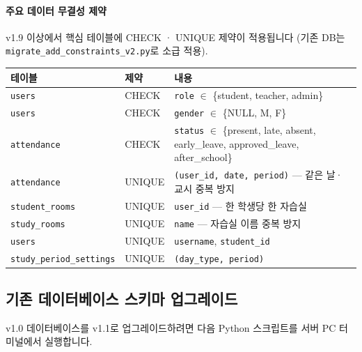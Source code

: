 \documentclass[a4paper,12pt]{article}
\begin{document}
\paragraph{주요 데이터 무결성 제약}

v1.9 이상에서 핵심 테이블에 CHECK · UNIQUE 제약이 적용됩니다
(기존 DB는 \texttt{migrate\_add\_constraints\_v2.py}로 소급 적용).

\begin{center}
\begin{tabularx}{\textwidth}{llX}
\toprule
\textbf{테이블} & \textbf{제약} & \textbf{내용} \\
\midrule
\texttt{users}         & CHECK & \texttt{role} $\in$ \{student, teacher, admin\} \\
\texttt{users}         & CHECK & \texttt{gender} $\in$ \{NULL, M, F\} \\
\texttt{attendance}    & CHECK & \texttt{status} $\in$ \{present, late, absent, early\_leave, approved\_leave, after\_school\} \\
\texttt{attendance}    & UNIQUE & \texttt{(user\_id, date, period)} --- 같은 날·교시 중복 방지 \\
\texttt{student\_rooms} & UNIQUE & \texttt{user\_id} --- 한 학생당 한 자습실 \\
\texttt{study\_rooms}  & UNIQUE & \texttt{name} --- 자습실 이름 중복 방지 \\
\texttt{users}         & UNIQUE & \texttt{username}, \texttt{student\_id} \\
\texttt{study\_period\_settings} & UNIQUE & \texttt{(day\_type, period)} \\
\bottomrule
\end{tabularx}
\end{center}

\subsection{기존 데이터베이스 스키마 업그레이드}

v1.0 데이터베이스를 v1.1로 업그레이드하려면 다음 Python 스크립트를 서버 PC 터미널에서 실행합니다.
\end{document}
